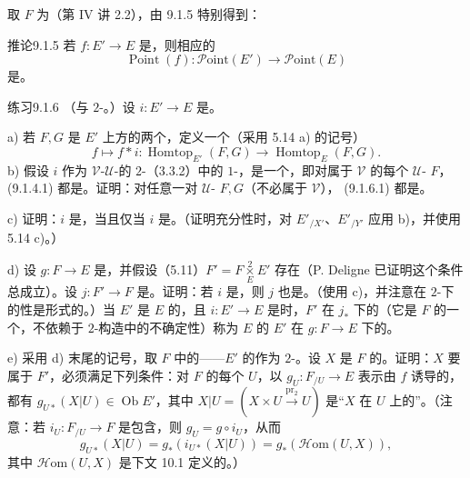 取 $F$ 为（第 IV 讲 2.2），由 9.1.5 特别得到：
\begin{SGAresult}{推论}{9.1.5}
若 $f:E'\to E$ 是，则相应的
\[
\operatorname{Point}(f):\mathscr{P}\mathrm{oint}(E')\longrightarrow\mathscr{P}\mathrm{oint}(E)\tag{9.1.5.1}
\]
是。
\end{SGAresult}
\begin{SGAresult}{练习}{9.1.6}
（与 $2$-。）设 $i:E'\to E$ 是。

a) 若 $F,G$ 是 $E'$ 上方的两个，定义一个（采用 5.14 a) 的记号）
\[
f\longmapsto f*i:\operatorname{Homtop}_{E'}(F,G)\longrightarrow\operatorname{Homtop}_{E}(F,G).\tag{9.1.6.1}
\]
b) 假设 $i$ 作为 $\mathcal V$-$\mathcal U$-的 $2$-（3.3.2）中的 $1$-，是一个，即对属于 $\mathcal V$ 的每个 $\mathcal U$- $F$， (9.1.4.1) 都是。证明：对任意一对 $\mathcal U$- $F,G$（不必属于 $\mathcal V$）， (9.1.6.1) 都是。

c) 证明：$i$ 是，当且仅当 $i$ 是。（证明充分性时，对 $E'_{/X'}$、$E'_{/Y'}$ 应用 b)，并使用 5.14 c)。）

d) 设 $g:F\to E$ 是，并假设（5.11）$F'=F\mathbin{\mathop{\times}\limits_E^{2}}E'$ 存在（P. Deligne 已证明这个条件总成立）。设 $j:F'\to F$ 是。证明：若 $i$ 是，则 $j$ 也是。（使用 c)，并注意在 $2$-下的性是形式的。）当 $E'$ 是 $E$ 的，且 $i:E'\to E$ 是时，$F'$ 在 $j_*$ 下的（它是 $F$ 的一个，不依赖于 $2$-构造中的不确定性）称为 $E$ 的 $E'$ 在 $g:F\to E$ 下的。

e) 采用 d) 末尾的记号，取 $F$ 中的——$E'$ 的作为 $2$-。设 $X$ 是 $F$ 的。证明：$X$ 要属于 $F'$，必须满足下列条件：对 $F$ 的每个 $U$，以 $g_U:F_{/U}\to E$ 表示由 $f$ 诱导的，都有 $g_{U*}(X|U)\in\operatorname{Ob}E'$，其中 $X|U=(X\times U\xrightarrow{\operatorname{pr}_2}U)$ 是“$X$ 在 $U$ 上的”。（注意：若 $i_U:F_{/U}\to F$ 是包含，则 $g_U=g\circ i_U$，从而
\[
g_{U*}(X|U)=g_*(i_{U*}(X|U))=g_*(\mathscr{H}\mathrm{om}(U,X)),
\]
其中 $\mathscr{H}\mathrm{om}(U,X)$ 是下文 10.1 定义的。）


\end{SGAresult}
